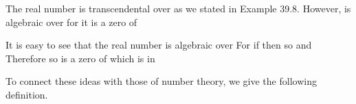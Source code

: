 \documentclass[11pt,oneside]{article}
\begin{document}
\begin{BookBody}
 The real number \BookInline{\pi } is transcendental over  as we stated in Example 39.8. However, \BookInline{\pi } is algebraic over  for it is a zero of \BookEnd{\blacktriangle}

 It is easy to see that the real number  is algebraic over  For if  then  so  and  Therefore  so \BookInline{\alpha } is a zero of  which is in \BookEnd{\blacktriangle}

To connect these ideas with those of number theory, we give the following definition.

\end{BookBody}

\BookNarrativetrue
\end{document}
